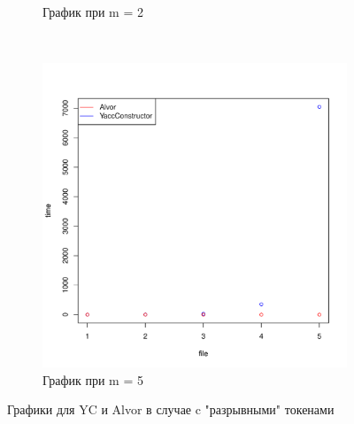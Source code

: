\documentclass{matmex-diploma}
\begin{document}
\begin{figure}
\begin{subfigure}[b]{0.3\textwidth}
                \caption{График при m = 2}
                \label{fig:m=2_YC_Alvor}
        \end{subfigure}
        ~ %
        \begin{subfigure}[b]{0.3\textwidth}
                \includegraphics[width=\textwidth]{m=5_breakYC_Alvor}
                \caption{График при m = 5}
                \label{fig:m=5_YC_Alvor}
        \end{subfigure}
        \caption{Графики для YC и Alvor в случае c "разрывными" токенами}\label{fig:graph_yc_alvor_break}
\end{figure}
\end{document}
